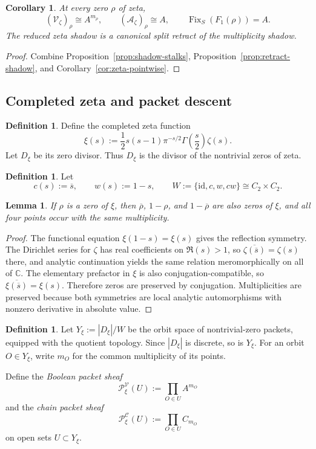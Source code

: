 \documentclass[11pt,a4paper]{article}
\newtheorem{lemma}[theorem]{Lemma}
\newtheorem{corollary}[theorem]{Corollary}
\theoremstyle{definition}
\newtheorem{definition}[theorem]{Definition}
\theoremstyle{remark}
\DeclareMathOperator{\Fix}{Fix}
\newcommand{\CC}{\mathbb C}
\newcommand{\cV}{\mathcal V}
\newcommand{\cA}{\mathcal A}
\newcommand{\cC}{\mathcal C}
\begin{document}
\begin{corollary}\label{cor:zeta-shadow-sheaves}
At every zero $\rho$ of zeta,
\[
(\cV_\zeta)_\rho\cong A^{m_\rho},
\qquad
(\cA_\zeta)_\rho\cong A,
\qquad
\Fix_S(F_1(\rho))=A.
\]
The reduced zeta shadow is a canonical split retract of the multiplicity shadow.
\end{corollary}

\begin{proof}
Combine Proposition~\ref{prop:shadow-stalks}, Proposition~\ref{prop:retract-shadow}, and Corollary~\ref{cor:zeta-pointwise}.
\end{proof}

\subsection{Completed zeta and packet descent}

\begin{definition}
Define the completed zeta function
\[
\xi(s):=\frac12 s(s-1)\pi^{-s/2}\Gamma\!\left(\frac s2\right)\zeta(s).
\]
Let $D_\xi$ be its zero divisor.  Thus $D_\xi$ is the divisor of the nontrivial zeros of zeta.
\end{definition}

\begin{definition}
Let
\[
c(s):=\overline s,
\qquad
w(s):=1-s,
\qquad
W:=\{\mathrm{id},c,w,cw\}\cong C_2\times C_2.
\]
\end{definition}

\begin{lemma}\label{lem:xi-symmetry-multiplicity}
If $\rho$ is a zero of $\xi$, then $\overline\rho$, $1-\rho$, and $1-\overline\rho$ are also zeros of $\xi$, and all four points occur with the same multiplicity.
\end{lemma}

\begin{proof}
The functional equation $\xi(1-s)=\xi(s)$ gives the reflection symmetry.  The Dirichlet series for $\zeta$ has real coefficients on $\Re(s)>1$, so $\overline{\zeta(\overline s)}=\zeta(s)$ there, and analytic continuation yields the same relation meromorphically on all of $\CC$.  The elementary prefactor in $\xi$ is also conjugation-compatible, so $\overline{\xi(\overline s)}=\xi(s)$.  Therefore zeros are preserved by conjugation.  Multiplicities are preserved because both symmetries are local analytic automorphisms with nonzero derivative in absolute value.
\end{proof}

\begin{definition}
Let $Y_\xi:=|D_\xi|/W$ be the orbit space of nontrivial-zero packets, equipped with the quotient topology.  Since $|D_\xi|$ is discrete, so is $Y_\xi$.  For an orbit $O\in Y_\xi$, write $m_O$ for the common multiplicity of its points.

Define the \emph{Boolean packet sheaf}
\[
\mathcal P_\xi^{\cV}(U):=\prod_{O\in U}A^{m_O}
\]
and the \emph{chain packet sheaf}
\[
\mathcal P_\xi^{\cC}(U):=\prod_{O\in U}C_{m_O}
\]
on open sets $U\subset Y_\xi$.
\end{definition}
\end{document}
